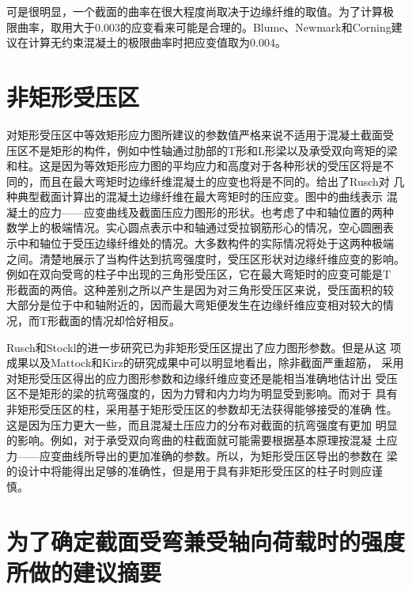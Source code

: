 \documentclass[12pt,a4paper]{book}
\begin{document}
可是很明显，一个截面的曲率在很大程度尚取决于边缘纤维的取值。为了计算极
限曲率，取用大于0.003的应变看来可能是合理的。Blume、Newmark和Corning建
议在计算无约束混凝土的极限曲率时把应变值取为0.004。

\section{非矩形受压区}

对矩形受压区中等效矩形应力图所建议的参数值严格来说不适用于混凝土截面受
压区不是矩形的构件，例如中性轴通过肋部的T形和L形梁以及承受双向弯矩的梁
和柱。这是因为等效矩形应力图的平均应力和高度对于各种形状的受压区将是不
同的，而且在最大弯矩时边缘纤维混凝土的应变也将是不同的。给出了Rusch对
几种典型截面计算出的混凝土边缘纤维在最大弯矩时的压应变。图中的曲线表示
混凝土的应力——应变曲线及截面压应力图形的形状。也考虑了中和轴位置的两种
数学上的极端情况。实心圆点表示中和轴通过受拉钢筋形心的情况，空心圆圈表
示中和轴位于受压边缘纤维处的情况。大多数构件的实际情况将处于这两种极端
之间。清楚地展示了当构件达到抗弯强度时，受压区形状对边缘纤维应变的影响。
例如在双向受弯的柱子中出现的三角形受压区，它在最大弯矩时的应变可能是T
形截面的两倍。这种差别之所以产生是因为对三角形受压区来说，受压面积的较
大部分是位于中和轴附近的，因而最大弯矩便发生在边缘纤维应变相对较大的情
况，而T形截面的情况却恰好相反。

Rusch和Stockl的进一步研究已为非矩形受压区提出了应力图形参数。但是从这
项成果以及Mattock和Kirz的研究成果中可以明显地看出，除非截面严重超筋，
采用对矩形受压区得出的应力图形参数和边缘纤维应变还是能相当准确地估计出
受压区不是矩形的梁的抗弯强度的，因为力臂和内力均为明显受到影响。而对于
具有非矩形受压区的柱，采用基于矩形受压区的参数却无法获得能够接受的准确
性。这是因为压力更大一些，而且混凝土压应力的分布对截面的抗弯强度有更加
明显的影响。例如，对于承受双向弯曲的柱截面就可能需要根据基本原理按混凝
土应力——应变曲线所导出的更加准确的参数。所以，为矩形受压区导出的参数在
梁的设计中将能得出足够的准确性，但是用于具有非矩形受压区的柱子时则应谨
慎。

\section{为了确定截面受弯兼受轴向荷载时的强度所做的建议摘要}
\end{document}
